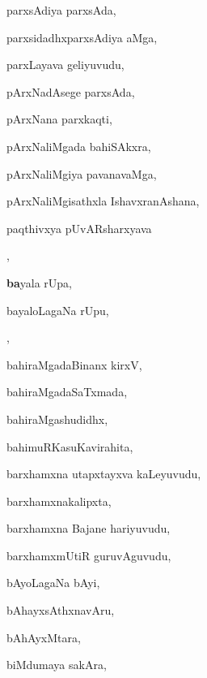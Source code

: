 \begin{multicols}{3}
{\noindent
{parxsAdiya parxsAda}, \pageref{parxsAdiya parxsAda}

\noindent
{parxsidadhxparxsAdiya aMga}, \pageref{parxsidadhxparxsAdiya aMga}

\noindent
{parxLayava geliyuvudu}, \pageref{parxLayava geliyuvudu}

\noindent
{pArxNadAsege parxsAda}, \pageref{pArxNadAsege parxsAda}

\noindent
{pArxNana parxkaqti}, \pageref{pArxNana parxkaqti}

\noindent
{pArxNaliMgada bahiSAkxra}, \pageref{pArxNaliMgada bahiSAkxra}

\noindent
{pArxNaliMgiya pavanavaMga}, \pageref{pArxNaliMgiya pavanavaMga}

\noindent
{pArxNaliMgisathxla IshavxranAshana}, \pageref{pArxNaliMgisathxla IshavxranAshana}

\noindent
{paqthivxya pUvARsharxyava}

\noindent
{}, \pageref{paqthivxya pUvARsharxyava kaLeyuvudu}

\noindent
{{\large\textbf{ba}}yala rUpa}, \pageref{bayala rUpa}

\noindent
{bayaloLagaNa rUpu,}

\noindent
{}, \pageref{bayaloLagaNa rUpu, rUpinoLagaNa bayalu}

\noindent
{bahiraMgadaBinanx kirxV}, \pageref{bahiraMgadaBinanx kirxV}

\noindent
{bahiraMgadaSaTxmada}, \pageref{bahiraMgadaSaTxmada}

\noindent
{bahiraMgashudidhx}, \pageref{bahiraMgashudidhx}

\noindent
{bahimuRKasuKavirahita}, \pageref{bahimuRKasuKavirahita}

\noindent
{barxhamxna utapxtayxva kaLeyuvudu}, \pageref{barxhamxna utapxtayxva kaLeyuvudu}

\noindent
{barxhamxnakalipxta}, \pageref{barxhamxnakalipxta}

\noindent
{barxhamxna Bajane hariyuvudu}, \pageref{barxhamxna Bajane hariyuvudu}

\noindent
{barxhamxmUtiR guruvAguvudu}, \pageref{barxhamxmUtiR guruvAguvudu}

\noindent
{bAyoLagaNa bAyi}, \pageref{bAyoLagaNa bAyi}

\noindent
{bAhayxsAthxnavAru}, \pageref{bAhayxsAthxnavAru}

\noindent
{bAhAyxMtara}, \pageref{bAhAyxMtara}

\noindent
{biMdumaya sakAra}, \pageref{biMdumaya sakAra}

}
\end{multicols}
